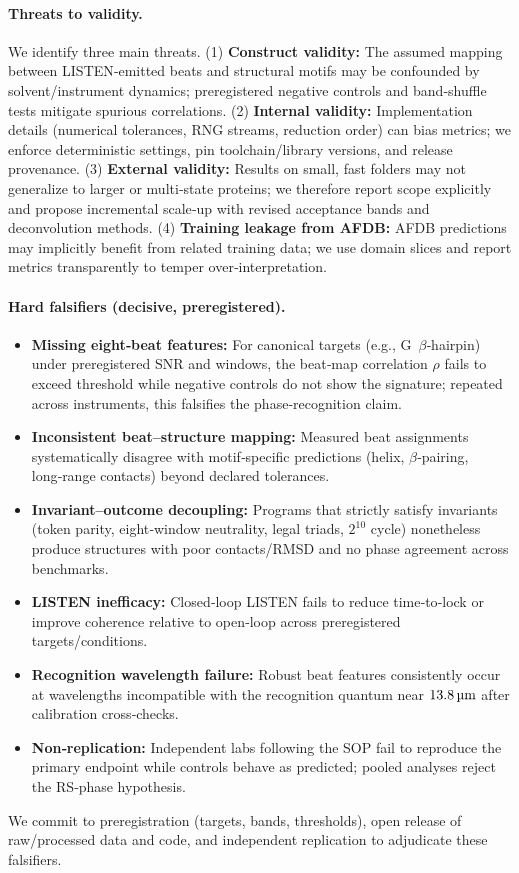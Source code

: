\documentclass[12pt,a4paper]{article}
\begin{document}
\paragraph{Threats to validity.}
We identify three main threats. (1) \textbf{Construct validity:} The assumed mapping between LISTEN‑emitted beats and structural motifs may be confounded by solvent/instrument dynamics; preregistered negative controls and band‑shuffle tests mitigate spurious correlations. (2) \textbf{Internal validity:} Implementation details (numerical tolerances, RNG streams, reduction order) can bias metrics; we enforce deterministic settings, pin toolchain/library versions, and release provenance. (3) \textbf{External validity:} Results on small, fast folders may not generalize to larger or multi‑state proteins; we therefore report scope explicitly and propose incremental scale‑up with revised acceptance bands and deconvolution methods. (4) \textbf{Training leakage from AFDB:} AFDB predictions may implicitly benefit from related training data; we use domain slices and report metrics transparently to temper over‑interpretation.

\paragraph{Hard falsifiers (decisive, preregistered).}
\begin{itemize}
  \item \textbf{Missing eight‑beat features:} For canonical targets (e.g., G~$\beta$‑hairpin) under preregistered SNR and windows, the beat‑map correlation $\rho$ fails to exceed threshold while negative controls do not show the signature; repeated across instruments, this falsifies the phase‑recognition claim.
  \item \textbf{Inconsistent beat–structure mapping:} Measured beat assignments systematically disagree with motif‑specific predictions (helix, $\beta$‑pairing, long‑range contacts) beyond declared tolerances.
  \item \textbf{Invariant–outcome decoupling:} Programs that strictly satisfy invariants (token parity, eight‑window neutrality, legal triads, $2^{10}$ cycle) nonetheless produce structures with poor contacts/RMSD and no phase agreement across benchmarks.
  \item \textbf{LISTEN inefficacy:} Closed‑loop LISTEN fails to reduce time‑to‑lock or improve coherence relative to open‑loop across preregistered targets/conditions.
  \item \textbf{Recognition wavelength failure:} Robust beat features consistently occur at wavelengths incompatible with the recognition quantum near $13.8\,\text{\textmu m}$ after calibration cross‑checks.
  \item \textbf{Non‑replication:} Independent labs following the SOP fail to reproduce the primary endpoint while controls behave as predicted; pooled analyses reject the RS‑phase hypothesis.
\end{itemize}
We commit to preregistration (targets, bands, thresholds), open release of raw/processed data and code, and independent replication to adjudicate these falsifiers.
\end{document}
